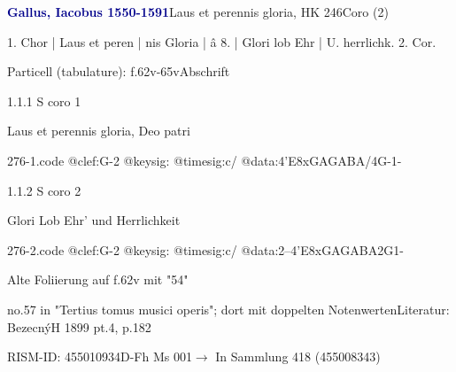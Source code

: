 \documentclass[twocolumn]{book}
\begin{document}
\par \vspace{7pt} \textcolor{darkblue}{\textbf{Gallus, Iacobus  1550-1591}}\hfillplus{\textbf{[276]}}\newline Laus et perennis gloria, HK 246\newline Coro (2)
\par \begin{itshape}[f.62v, at left:] 1. Chor | Laus et peren | nis Gloria | â 8. | Glori lob Ehr | U. herrlichk. 2. Cor.\end{itshape} 
\par \textcolor{darkblue}{}  Particell (tabulature): f.62v-65v\newline Abschrift
\par 1.1.1  S coro 1\newline \begin{footnotesize} Laus et perennis gloria, Deo patri \end{footnotesize}  
\begin{filecontents*}{276-1.code}
@clef:G-2
@keysig:
@timesig:c/
@data:4'E{8xGA}{GABA}/4G-1-
\end{filecontents*}
\newline
%
\par 1.1.2  S coro 2\newline \begin{footnotesize} Glori Lob Ehr' und Herrlichkeit \end{footnotesize}  
\begin{filecontents*}{276-2.code}
@clef:G-2
@keysig:
@timesig:c/
@data:2--4'E{8xGAGA}{BA}2G1-
\end{filecontents*}
\newline
%
\par Alte Foliierung auf f.62v mit "54"
\par no.57 in "Tertius tomus musici operis"; dort mit doppelten Notenwerten\newline Literatur: BezecnýH 1899  pt.4, p.182
\par RISM-ID: 455010934\newline D-Fh  Ms 001\newline $\rightarrow$ In Sammlung 418 (455008343)
      
\end{document}
